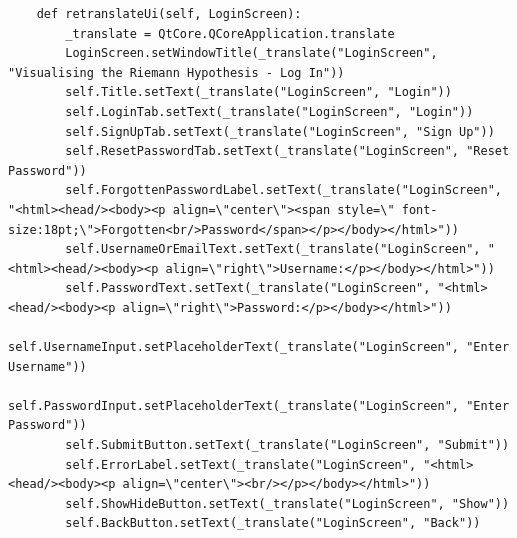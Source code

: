 \documentclass{article}
\begin{document}
\begin{lstlisting}
    def retranslateUi(self, LoginScreen):
        _translate = QtCore.QCoreApplication.translate
        LoginScreen.setWindowTitle(_translate("LoginScreen", "Visualising the Riemann Hypothesis - Log In"))
        self.Title.setText(_translate("LoginScreen", "Login"))
        self.LoginTab.setText(_translate("LoginScreen", "Login"))
        self.SignUpTab.setText(_translate("LoginScreen", "Sign Up"))
        self.ResetPasswordTab.setText(_translate("LoginScreen", "Reset Password"))
        self.ForgottenPasswordLabel.setText(_translate("LoginScreen", "<html><head/><body><p align=\"center\"><span style=\" font-size:18pt;\">Forgotten<br/>Password</span></p></body></html>"))
        self.UsernameOrEmailText.setText(_translate("LoginScreen", "<html><head/><body><p align=\"right\">Username:</p></body></html>"))
        self.PasswordText.setText(_translate("LoginScreen", "<html><head/><body><p align=\"right\">Password:</p></body></html>"))
        self.UsernameInput.setPlaceholderText(_translate("LoginScreen", "Enter Username"))
        self.PasswordInput.setPlaceholderText(_translate("LoginScreen", "Enter Password"))
        self.SubmitButton.setText(_translate("LoginScreen", "Submit"))
        self.ErrorLabel.setText(_translate("LoginScreen", "<html><head/><body><p align=\"center\"><br/></p></body></html>"))
        self.ShowHideButton.setText(_translate("LoginScreen", "Show"))
        self.BackButton.setText(_translate("LoginScreen", "Back"))
\end{lstlisting}
\end{document}
